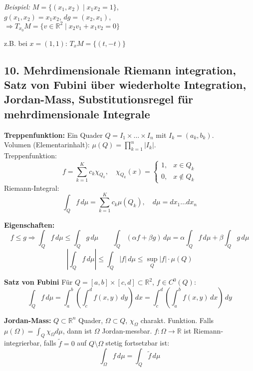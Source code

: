 \vspace{0.5em}

\textit{Beispiel:} $M = \{(x_1,x_2) \mid x_1x_2 = 1\}$,\\
$g(x_1,x_2) = x_1x_2$, $dg = (x_2, x_1)$,\\
$\Rightarrow T_{x_0}M = \{v \in \mathbb{R}^2 \mid x_2v_1 + x_1v_2 = 0\}$

z.B. bei $x = (1,1)$: $T_xM = \{(t, -t)\}$



\subsection{10. Mehrdimensionale Riemann integration, Satz von Fubini über wiederholte Integration, Jordan-Mass, Substitutionsregel für mehrdimensionale Integrale}

\textbf{Treppenfunktion:}
Ein Quader \( Q = I_1 \times \dots \times I_n \) mit \( I_k = (a_k, b_k) \). \\
Volumen (Elementarinhalt): \( \mu(Q) = \prod_{k=1}^n |I_k| \). \\
Treppenfunktion:
\[
f = \sum_{k=1}^K c_k \chi_{Q_k}, \quad
\chi_{Q_k}(x) = \begin{cases}
1, & x \in Q_k \\
0, & x \notin Q_k
\end{cases}
\]
Riemann-Integral:
\[
\int_Q f\,d\mu = \sum_{k=1}^K c_k \mu(Q_k), \quad
d\mu = dx_1 \dots dx_n
\]

\vspace{0.5em}
\textbf{Eigenschaften:}
\[
f \leq g \Rightarrow \int_Q f\,d\mu \leq \int_Q g\,d\mu \qquad
\int_Q (\alpha f + \beta g)\,d\mu = \alpha \int_Q f\,d\mu + \beta \int_Q g\,d\mu
\]
\[
\left| \int_Q f\,d\mu \right| \leq \int_Q |f|\,d\mu \leq \sup_Q |f| \cdot \mu(Q)
\]

\vspace{0.5em}
\textbf{Satz von Fubini}
Für \( Q = [a,b] \times [c,d] \subset \mathbb{R}^2 \), \( f \in C^0(Q) \):
\[
\int_Q f\,d\mu = \int_a^b \left( \int_c^d f(x,y)\,dy \right)\,dx
= \int_c^d \left( \int_a^b f(x,y)\,dx \right)\,dy
\]

\vspace{0.5em}
\textbf{Jordan-Mass:}  
\( Q \subset \mathbb{R}^n \) Quader, \( \Omega \subset Q \), \( \chi_\Omega \) charakt. Funktion.  
Falls \( \mu(\Omega) = \int_Q \chi_\Omega d\mu \), dann ist \( \Omega \) Jordan-messbar.  
\( f : \Omega \to \mathbb{R} \) ist Riemann-integrierbar, falls \( \tilde{f} = 0 \) auf \( Q \setminus \Omega \) stetig fortsetzbar ist:
\[
\int_\Omega f\,d\mu = \int_Q \tilde{f}\,d\mu
\]

